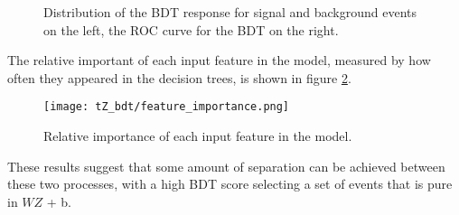 \begin{figure}[H]
\center
    \caption{Distribution of the BDT response for signal and background events on the left, the ROC curve for the BDT on the right.}
    \label{fig:tZ_bdt}
\end{figure}

The relative important of each input feature in the model, measured by how often they appeared in the decision trees, is shown in figure \ref{fig:tZ_fImp}.

\begin{figure}[H]
\center
        \texttt{[image: tZ\_bdt/feature\_importance.png]}
        \caption{Relative importance of each input feature in the model.}
        \label{fig:tZ_fImp}
\end{figure}

These results suggest that some amount of separation can be achieved between these two processes, with a high BDT score selecting a set of events that is pure in $WZ$ + b. 

